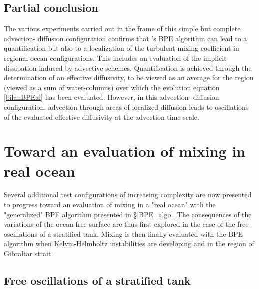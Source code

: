 \subsection{Partial conclusion}
The various experiments carried out in the frame of this simple but complete advection- diffusion configuration confirms that \cite{winters_available_1995}'s BPE algorithm can lead to a quantification but also to a localization of the turbulent mixing coefficient in regional ocean configurations. This includes an evaluation of the implicit dissipation induced by advective schemes.
Quantification is achieved through the determination of an effective diffusivity, to be
viewed as an average for the region (viewed as a sum of water-columns) over which the evolution equation \ref{bilanBPEal} has been evaluated. However, in this advection- diffusion configuration, advection through areas of localized diffusion leads to oscillations of the evaluated effective diffusivity at the advection time-scale. 


\section{Toward an evaluation of mixing in real ocean}
\label{section_CROCO_BPE}
Several additional test configurations of increasing complexity are now presented to progress toward an evaluation of mixing in a "real ocean" with the "generalized" BPE algorithm presented in \S \ref{BPE_algo}. The consequences of the variations of the ocean free-surface are thus first explored in the case of the free oscillations of a stratified tank. Mixing is then finally evaluated with the BPE algorithm when Kelvin-Helmholtz instabilities are developing and in the region of Gibraltar strait.

\subsection{Free oscillations of a stratified tank}

